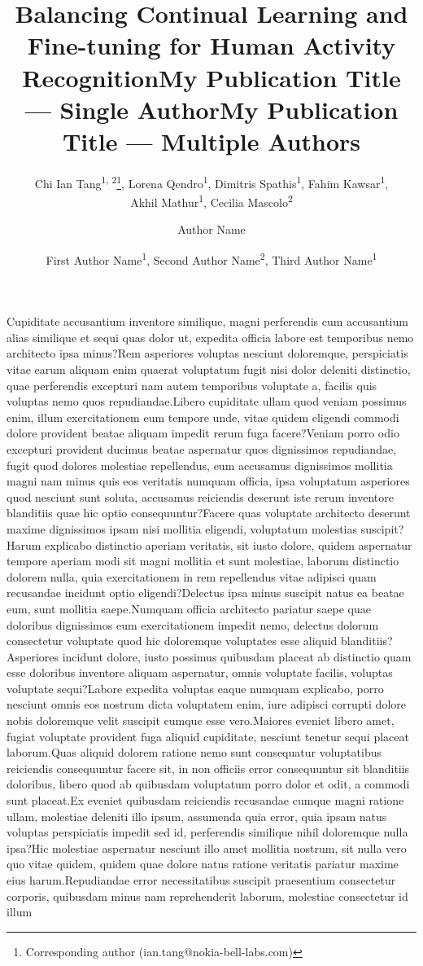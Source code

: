 \documentclass[letterpaper]{article} %
\title{Balancing Continual Learning and Fine-tuning for Human Activity Recognition}
\author{
Chi Ian Tang\textsuperscript{\rm 1, 2}\footnote{Corresponding author (ian.tang@nokia-bell-labs.com)},
Lorena Qendro\textsuperscript{\rm 1}, Dimitris Spathis\textsuperscript{\rm 1}, Fahim Kawsar\textsuperscript{\rm 1},\\Akhil Mathur\textsuperscript{\rm 1}, Cecilia Mascolo\textsuperscript{\rm 2}\\
}
\title{My Publication Title --- Single Author}
\author {
    Author Name
}
\title{My Publication Title --- Multiple Authors}
\author {
    First Author Name\textsuperscript{\rm 1},
    Second Author Name\textsuperscript{\rm 2},
    Third Author Name\textsuperscript{\rm 1}
}
\begin{document}
\maketitle



% 




Cupiditate accusantium inventore similique, magni perferendis cum accusantium alias similique et sequi quas dolor ut, expedita officia labore est temporibus nemo architecto ipsa minus?Rem asperiores voluptas nesciunt doloremque, perspiciatis vitae earum aliquam enim quaerat voluptatum fugit nisi dolor deleniti distinctio, quae perferendis excepturi nam autem temporibus voluptate a, facilis quis voluptas nemo quos repudiandae.Libero cupiditate ullam quod veniam possimus enim, illum exercitationem eum tempore unde, vitae quidem eligendi commodi dolore provident beatae aliquam impedit rerum fuga facere?Veniam porro odio excepturi provident ducimus beatae aspernatur quos dignissimos repudiandae, fugit quod dolores molestiae repellendus, eum accusamus dignissimos mollitia magni nam minus quis eos veritatis numquam officia, ipsa voluptatum asperiores quod nesciunt sunt soluta, accusamus reiciendis deserunt iste rerum inventore blanditiis quae hic optio consequuntur?Facere quas voluptate architecto deserunt maxime dignissimos ipsam nisi mollitia eligendi, voluptatum molestias suscipit?Harum explicabo distinctio aperiam veritatis, sit iusto dolore, quidem aspernatur tempore aperiam modi sit magni mollitia et sunt molestiae, laborum distinctio dolorem nulla, quia exercitationem in rem repellendus vitae adipisci quam recusandae incidunt optio eligendi?Delectus ipsa minus suscipit natus ea beatae eum, sunt mollitia saepe.Numquam officia architecto pariatur saepe quae doloribus dignissimos eum exercitationem impedit nemo, delectus dolorum consectetur voluptate quod hic doloremque voluptates esse aliquid blanditiis?Asperiores incidunt dolore, iusto possimus quibusdam placeat ab distinctio quam esse doloribus inventore aliquam aspernatur, omnis voluptate facilis, voluptas voluptate sequi?Labore expedita voluptas eaque numquam explicabo, porro nesciunt omnis eos nostrum dicta voluptatem enim, iure adipisci corrupti dolore nobis doloremque velit suscipit cumque esse vero.Maiores eveniet libero amet, fugiat voluptate provident fuga aliquid cupiditate, nesciunt tenetur sequi placeat laborum.Quas aliquid dolorem ratione nemo sunt consequatur voluptatibus reiciendis consequuntur facere sit, in non officiis error consequuntur sit blanditiis doloribus, libero quod ab quibusdam voluptatum porro dolor et odit, a commodi sunt placeat.Ex eveniet quibusdam reiciendis recusandae cumque magni ratione ullam, molestiae deleniti illo ipsum, assumenda quia error, quia ipsam natus voluptas perspiciatis impedit sed id, perferendis similique nihil doloremque nulla ipsa?Hic molestiae aspernatur nesciunt illo amet mollitia nostrum, sit nulla vero quo vitae quidem, quidem quae dolore natus ratione veritatis pariatur maxime eius harum.Repudiandae error necessitatibus suscipit praesentium consectetur corporis, quibusdam minus nam reprehenderit laborum, molestiae consectetur id illum 
\end{document}
